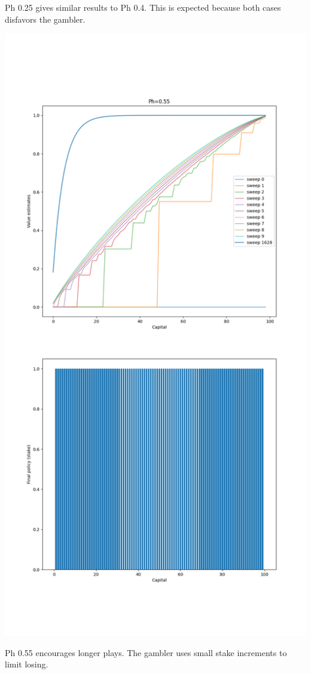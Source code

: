 \documentclass[11pt]{article}
\begin{document}
    Ph 0.25 gives similar results to Ph 0.4. This is expected because both cases disfavors the gambler.

    \includegraphics[scale=0.4]{figure_4_3_e_4_9_p55}

    Ph 0.55 encourages longer plays.
    The gambler uses small stake increments to limit losing.
\end{document}
